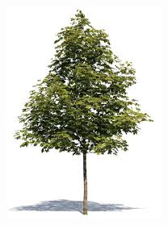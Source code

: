 \documentclass[aspectratio=43]{beamer}
\begin{document}
\begin{frame}
\begin{figure}
		\endminipage\hfill
		\includegraphics[width = \linewidth]{tree3.jpeg}
		\endminipage
	\end{figure}

\end{frame}
\end{document}

